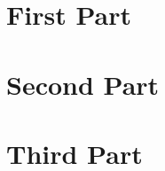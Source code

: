 \documentclass[11pt]{book}
\begin{document}
\frontmatter


\mainmatter
\part{First Part}


\part{Second Part}


\part{Third Part}


\backmatter







\latexprintindex
\end{document}
